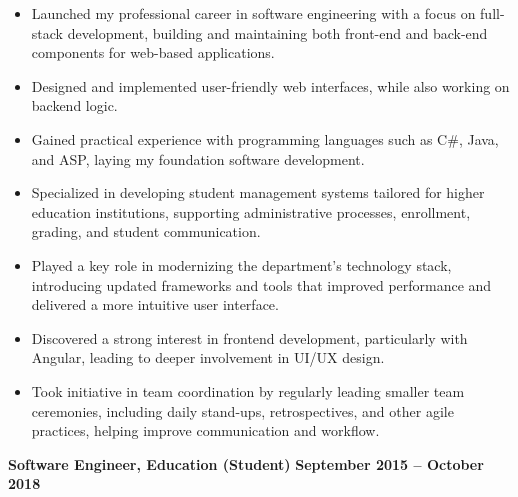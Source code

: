 \documentclass[10pt, a4paper]{cvhari}
\begin{document}
    \vspace{0.2em}
    \begin{itemize}
         
        \item Launched my professional career in software engineering with a focus on full-stack development, building and maintaining both front-end and back-end components for web-based applications.

        \item Designed and implemented user-friendly web interfaces, while also working on backend logic.

        \item Gained practical experience with programming languages such as C\#, Java, and ASP, laying my foundation software development.

        \item Specialized in developing student management systems tailored for higher education institutions, supporting administrative processes, enrollment, grading, and student communication.

        \item Played a key role in modernizing the department’s technology stack, introducing updated frameworks and tools that improved performance and delivered a more intuitive user interface.

        \item Discovered a strong interest in frontend development, particularly with Angular, leading to deeper involvement in UI/UX design.

        \item Took initiative in team coordination by regularly leading smaller team ceremonies, including daily stand-ups, retrospectives, and other agile practices, helping improve communication and workflow.

\end{itemize}

\smallskip
\divider
\smallskip

    \textbf{Software Engineer, Education (Student)} \hfill \textbf{September 2015 -- October 2018}
\end{document}
